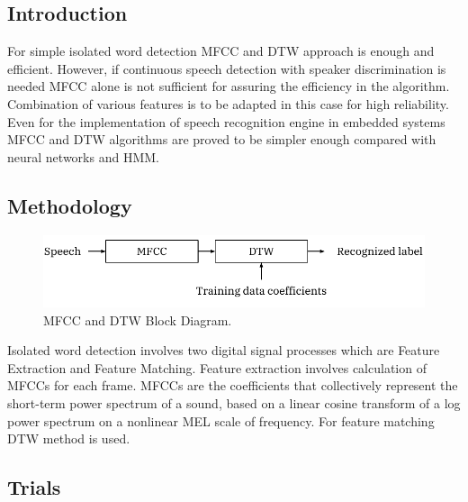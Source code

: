\documentclass[12pt, a4paper, twoside]{report}
\begin{document}
\subsection{Introduction}
For simple isolated word detection MFCC and DTW approach is enough and efficient. However, if continuous speech detection with speaker discrimination is needed MFCC alone is not sufficient for assuring the efficiency in the algorithm.  Combination of various features is to be adapted in this case for high reliability. Even for the implementation of speech recognition engine in embedded systems MFCC and DTW algorithms are proved to be simpler enough compared with neural networks and HMM. 
\subsection{Methodology}
\begin{figure}[!h]
	\centering
	\includegraphics[]
	{images/chapter5/dtw-blocks}
	\caption{MFCC and DTW Block Diagram.}
	\label{fig:dtw-blocks}
\end{figure}

Isolated word detection involves two digital signal processes which are Feature Extraction and Feature Matching.  Feature extraction involves calculation of MFCCs for each frame. MFCCs are the coefficients that collectively represent the short-term power spectrum of a sound, based on a linear cosine transform of a log power spectrum on a nonlinear MEL scale of frequency. For feature matching DTW method is used.

\subsection{Trials}
\end{document}

